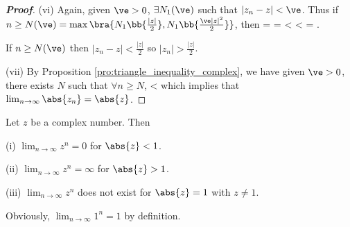 \begin{proof}[\bf Proof]
\item [(vi)] Again, given $\ve > 0$, $\exists N_1(\ve)$ such that $|z_n - z| < \ve$. Thus if $n \geq N(\ve) = \max\bra{N_1\bb{\frac{|z|}{2}}, N_1\bb{\frac{\ve|z|^2}{2}}}$, then
\be
{} =  =  < < \cdot {} = \ve.
\ee

If $n \geq N(\ve)$ then $|z_n - z| < \frac{|z|}{2}$ so $|z_n| > \frac{|z|}{2}$.

\item [(vii)] By Proposition \ref{pro:triangle_inequality_complex}, we have given $\ve>0$, there exists $N$ such that $\forall n\geq N$,
\be
{} \leq {} <\ve
\ee
which implies that $\lim_{n\to \infty}\abs{z_n} = \abs{z}$.
\een
\end{proof}

\begin{proposition}\label{pro:convergence_of_complex_power_function}
Let $z$ be a complex number. Then
\ben
\item [(i)] $\lim_{n\to \infty} z^n = 0$ for $\abs{z} <1$.
\item [(ii)] $\lim_{n\to \infty} z^n = \infty$ for $\abs{z}>1$.
\item [(iii)] $\lim_{n\to \infty} z^n$ does not exist for $\abs{z}=1$ with $z\neq 1$.
\een
\end{proposition}

\begin{remark}
Obviously, $\lim_{n\to \infty} 1^n = 1$ by definition.
\end{remark}

